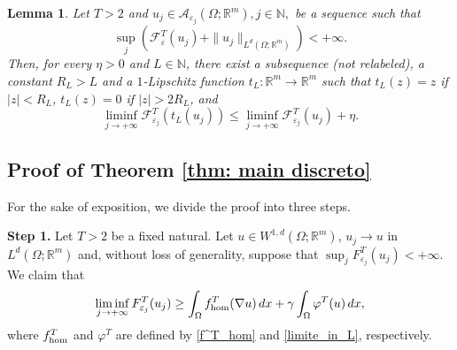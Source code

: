 \documentclass{article}
\theoremstyle{plain}
\newtheorem{lemma}[theorem]{Lemma}
\theoremstyle{definition}
\def\rr{{\mathbb R}}
\def\NN{{\mathbb N}}
\newcommand{\f}{\varphi}
\newcommand{\ej}{\varepsilon_j}
\numberwithin{equation}{section}
\begin{document}
    \begin{lemma}\label{lemma : siga}
    Let $T>2$ and $u_j \in \mathcal{A}_{\varepsilon_j}(\Omega;\mathbb{R}^{m}),j\in\NN,$ be a sequence such that 
    \begin{equation*}
        \sup_{j}(\mathcal{F}^T_{\varepsilon}(u_{j})+\|u_{j}\|_{L^d(\Omega;\mathbb{R}^{m})})<+\infty.
    \end{equation*} 
    Then, for every $\eta >0$ and $L \in \mathbb{N}$, there exist a subsequence (not relabeled), a constant $R_{L}>L$ and a $1$-Lipschitz function $t_{L}:\mathbb{R}^{m}\rightarrow \mathbb{R}^{m}$ such that $t_{L}(z)=z$ if $|z|<R_L$,  $t_{L}(z)=0$ if $|z|>2R_{L}$,
    and
    \begin{equation*}
        \liminf_{j\to+\infty}\mathcal{F}^T_{\varepsilon_{j}}(t_{L}(u_{j}))\leq \liminf_{j\to+\infty}\mathcal{F}^T_{\varepsilon_{j}}(u_{j})+\eta.
    \end{equation*}
\end{lemma}

\subsection{Proof of Theorem \ref{thm: main discreto}}

For the sake of exposition, we divide the proof into three steps.

\smallskip

{\bf Step 1.} Let $T>2$ be a fixed natural. Let $u\in W^{1,d}(\Omega;\rr^m)$, $u_j\to u$ in $L^d(\Omega; \rr^m)$ and, without loss of generality, suppose that $\sup_j F^T_{\ej}(u_j)<+\infty$. We claim that
\begin{equation}\label{liminf T: claim}
    \liminf_{j\to+\infty} F_{\ej}^T(u_j)\geq \int_\Omega f_{\rm hom}^T(\nabla u)\, dx +\gamma \int_\Omega \f^T(u)\,dx,
\end{equation}
where $f_{\rm hom}^T$ and $\f^T$ are defined by \eqref{f^T_hom} and \eqref{limite_in_L}, respectively.
\end{document}
